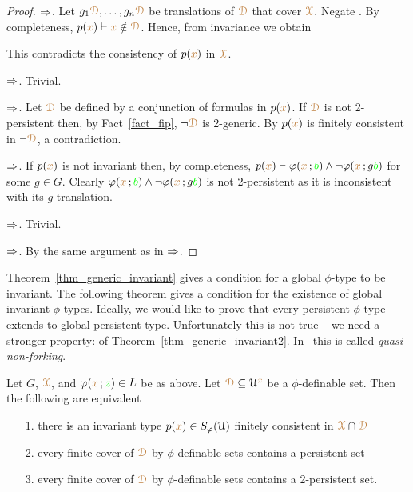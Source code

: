 \begin{proof}
  $\Rightarrow$.
  Let $g_1{\color{brown}\EuScript D},\dots,g_n{\color{brown}\EuScript D}$ be translations of ${\color{brown}\EuScript D}$ that cover ${\color{brown}\EuScript X}$.
  Negate .
  By completeness, $p({\color{brown} x})\vdash {\color{brown}x}\notin{\color{brown}\EuScript D}$.
  Hence, from invariance we obtain


  This contradicts the consistency of $p({\color{brown} x})$ in ${\color{brown}\EuScript X}$.

  $\Rightarrow$.
  Trivial.
  
  $\Rightarrow$.
  Let ${\color{brown}\EuScript D}$ be defined by a conjunction of formulas in $p({\color{brown} x})$.
  If ${\color{brown}\EuScript D}$ is not 2-persistent then, by Fact~\ref{fact_fip}, $\neg{\color{brown}\EuScript D}$ is 2-generic. 
  By  $p({\color{brown} x})$ is finitely consistent in   $\neg{\color{brown}\EuScript D}$, a contradiction.

  $\Rightarrow$.
  If $p({\color{brown} x})$ is not invariant then, by completeness, $p({\color{brown} x})\vdash\varphi({\color{brown} x}\,;{\color{green} b})\wedge\neg\varphi({\color{brown} x}\,;g{\color{green} b})$ for some $g\in G$.
  Clearly $\varphi({\color{brown} x}\,;{\color{green} b})\wedge\neg\varphi({\color{brown} x}\,;g{\color{green} b})$ is not 2-persistent as it is inconsistent with its $g$-translation.

  $\Rightarrow$.
  Trivial.

  $\Rightarrow$.
  By the same argument as in $\Rightarrow$.
\end{proof}

Theorem~\ref{thm_generic_invariant} gives a condition for a global $\phi$-type to be invariant.
The following theorem gives a condition for the existence of global invariant $\phi$-types.
Ideally, we would like to prove that every persistent $\phi$-type extends to global persistent type.
Unfortunately this is not true -- we need a stronger property:  of Theorem~\ref{thm_generic_invariant2}.
In~\cite{CK} this is called \textit{quasi-non-forking}.

\begin{theorem}\label{thm_generic_invariant2}
  Let $G$, ${\color{brown}\EuScript X}$, and $\varphi({\color{brown} x}\,;{\color{green} z})\in L$ be as above.
  Let ${\color{brown}\EuScript D}\subseteq\EuScript U^{\color{brown} x}$ be a $\phi$-definable set.
  Then the following are equivalent 
  \begin{itemize}
    \item[1.] there is an invariant type $p({\color{brown} x})\in S_\varphi(\EuScript U)$ finitely consistent in ${\color{brown}\EuScript X}\cap{\color{brown}\EuScript D}$
    \item[2.] every finite cover of ${\color{brown}\EuScript D}$ by $\phi$-definable sets contains a persistent set
    \item[3.] every finite cover of ${\color{brown}\EuScript D}$ by $\phi$-definable sets contains a 2-persistent set.
  \end{itemize}
\end{theorem}

